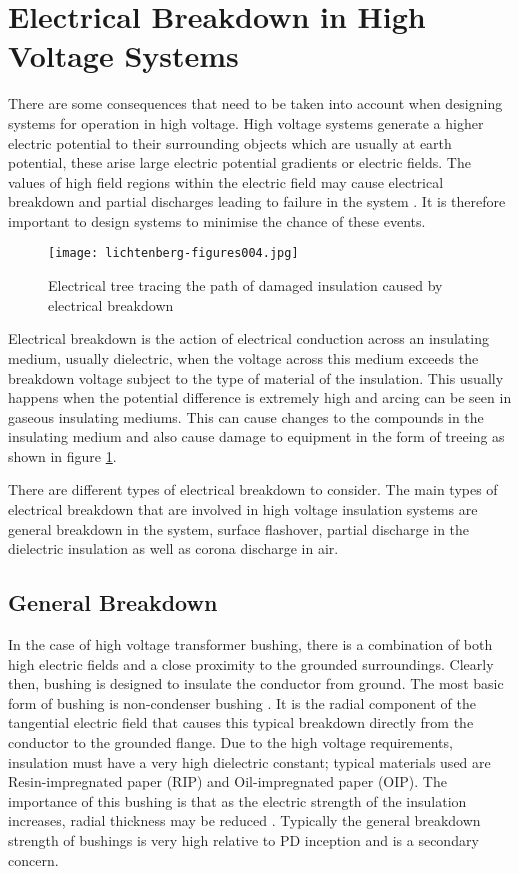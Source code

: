 \section{Electrical Breakdown in High Voltage Systems} %
There are some consequences that need to be taken into account when designing systems for operation in high voltage. High voltage systems generate a higher electric potential to their surrounding objects which are usually at earth potential, these arise large electric potential gradients or electric fields. The values of high field regions within the electric field may cause electrical breakdown and partial discharges leading to failure in the system \citep{kuffel2000high}. It is therefore important to design systems to minimise the chance of these events.
\begin{figure}[!h]
   \centering
   \texttt{[image: lichtenberg-figures004.jpg]}
   \caption{Electrical tree tracing the path of damaged insulation caused by electrical breakdown}
   \label{figure:breakdown}
\end{figure}
Electrical breakdown is the action of electrical conduction across an insulating medium, usually dielectric, when the voltage across this medium exceeds the breakdown voltage subject to the type of material of the insulation. This usually happens when the potential difference is extremely high and arcing can be seen in gaseous insulating mediums. This can cause changes to the compounds in the insulating medium and also cause damage to equipment in the form of treeing as shown in figure \ref{figure:breakdown}. 

There are different types of electrical breakdown to consider. The main types of electrical breakdown that are involved in high voltage insulation systems are general breakdown in the system, surface flashover, partial discharge in the dielectric insulation as well as corona discharge in air.

\subsection{General Breakdown} %
In the case of high voltage transformer bushing, there is a combination of both high electric fields and a close proximity to the grounded surroundings. Clearly then, bushing is designed to insulate the conductor from ground. The most basic form of bushing is non-condenser bushing \cite{HVEngandTesting}. It is the radial component of the tangential electric field that causes this typical breakdown directly from the conductor to the grounded flange. Due to the high voltage requirements, insulation must have a very high dielectric constant; typical materials used are Resin-impregnated paper (RIP) and Oil-impregnated paper (OIP). The importance of this bushing is that as the electric strength of the insulation increases, radial thickness may be reduced \cite{HVEngandTesting}. Typically the general breakdown strength of bushings is very high relative to PD inception and is a secondary concern.

